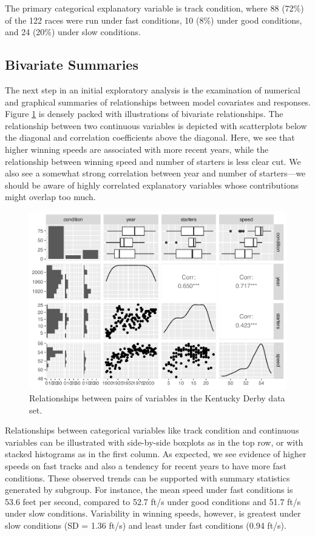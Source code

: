 \documentclass[
]{krantz}
\begin{document}
The primary categorical explanatory variable is track condition, where 88 (72\%) of the 122 races were run under fast conditions, 10 (8\%) under good conditions, and 24 (20\%) under slow conditions.

\subsection{Bivariate Summaries}\label{bivariate-summaries}

The next step in an initial exploratory analysis is the examination of numerical and graphical summaries of relationships between model covariates and responses. Figure \ref{fig:bivariate} is densely packed with illustrations of bivariate relationships. The relationship between two continuous variables is depicted with scatterplots below the diagonal and correlation coefficients above the diagonal. Here, we see that higher winning speeds are associated with more recent years, while the relationship between winning speed and number of starters is less clear cut. We also see a somewhat strong correlation between year and number of starters---we should be aware of highly correlated explanatory variables whose contributions might overlap too much.

\begin{figure}

{\centering \includegraphics[width=0.9\linewidth]{bookdown-BeyondMLR_files/figure-latex/bivariate-1} 

}

\caption{Relationships between pairs of variables in the Kentucky Derby data set.}\label{fig:bivariate}
\end{figure}

Relationships between categorical variables like track condition and continuous variables can be illustrated with side-by-side boxplots as in the top row, or with stacked histograms as in the first column. As expected, we see evidence of higher speeds on fast tracks and also a tendency for recent years to have more fast conditions. These observed trends can be supported with summary statistics generated by subgroup. For instance, the mean speed under fast conditions is 53.6 feet per second, compared to 52.7 ft/s under good conditions and 51.7 ft/s under slow conditions. Variability in winning speeds, however, is greatest under slow conditions (SD = 1.36 ft/s) and least under fast conditions (0.94 ft/s).
\end{document}
